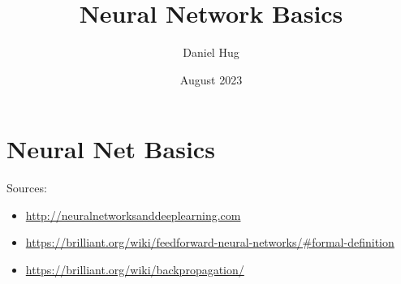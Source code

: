\documentclass[12pt,oneside,a4paper]{article}
\title{Neural Network Basics}
\author{Daniel Hug}
\date{August 2023}
\begin{document}
\maketitle

\setlength{\parindent}{0pt}

\section{Neural Net Basics}

Sources:
\begin{itemize}
    \item \url{http://neuralnetworksanddeeplearning.com}
    \item \url{https://brilliant.org/wiki/feedforward-neural-networks/\#formal-definition}
    \item \url{https://brilliant.org/wiki/backpropagation/}
\end{itemize}


\newpage


\end{document}
